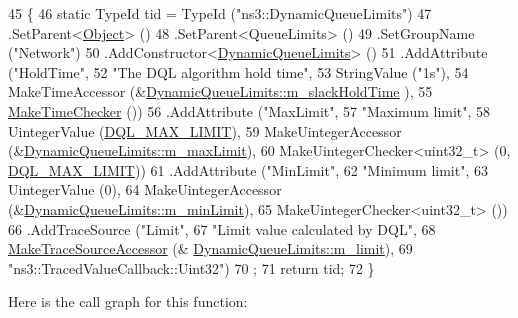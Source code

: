 \begin{DoxyCode}
45 \{
46   \textcolor{keyword}{static} TypeId tid = TypeId (\textcolor{stringliteral}{"ns3::DynamicQueueLimits"})
47     .SetParent<\hyperlink{classns3_1_1Object_a40860402e64d8008fb42329df7097cdb}{Object}> ()
48     .SetParent<QueueLimits> ()
49     .SetGroupName (\textcolor{stringliteral}{"Network"})
50     .AddConstructor<\hyperlink{classns3_1_1DynamicQueueLimits_a07592bd67de5bfd780e968f6b346ac61}{DynamicQueueLimits}> ()
51     .AddAttribute (\textcolor{stringliteral}{"HoldTime"},
52                    \textcolor{stringliteral}{"The DQL algorithm hold time"},
53                    StringValue (\textcolor{stringliteral}{"1s"}),
54                    MakeTimeAccessor (&\hyperlink{classns3_1_1DynamicQueueLimits_a788650e71ce18f137b3620a8659eeda3}{DynamicQueueLimits::m\_slackHoldTime}
      ),
55                    \hyperlink{group__time_ga7032965bd4afa578691d88c09e4481c1}{MakeTimeChecker} ())
56     .AddAttribute (\textcolor{stringliteral}{"MaxLimit"},
57                    \textcolor{stringliteral}{"Maximum limit"},
58                    UintegerValue (\hyperlink{dynamic-queue-limits_8cc_a24f26d18ca1562a31ad086b0d6cef65b}{DQL\_MAX\_LIMIT}),
59                    MakeUintegerAccessor (&\hyperlink{classns3_1_1DynamicQueueLimits_af4720582bb5b333dad967863d250e868}{DynamicQueueLimits::m\_maxLimit}),
60                    MakeUintegerChecker<uint32\_t> (0, \hyperlink{dynamic-queue-limits_8cc_a24f26d18ca1562a31ad086b0d6cef65b}{DQL\_MAX\_LIMIT}))
61     .AddAttribute (\textcolor{stringliteral}{"MinLimit"},
62                    \textcolor{stringliteral}{"Minimum limit"},
63                    UintegerValue (0),
64                    MakeUintegerAccessor (&\hyperlink{classns3_1_1DynamicQueueLimits_a6717698410fa64928d9c41108974ea66}{DynamicQueueLimits::m\_minLimit}),
65                    MakeUintegerChecker<uint32\_t> ())
66     .AddTraceSource (\textcolor{stringliteral}{"Limit"},
67                      \textcolor{stringliteral}{"Limit value calculated by DQL"},
68                      \hyperlink{group__tracing_gab21a770b9855af4e8f69f7531ea4a6b0}{MakeTraceSourceAccessor} (&
      \hyperlink{classns3_1_1DynamicQueueLimits_ace85f564a3f7b4aadfed9dc7df775579}{DynamicQueueLimits::m\_limit}),
69                      \textcolor{stringliteral}{"ns3::TracedValueCallback::Uint32"})
70   ;
71   \textcolor{keywordflow}{return} tid;
72 \}
\end{DoxyCode}


Here is the call graph for this function\+:


